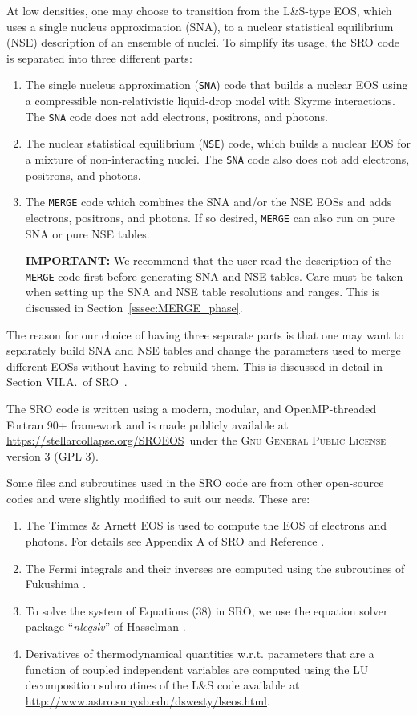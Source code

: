 \documentclass[letterpaper,11pt]{refart}
\newcommand{\srourl}{\url{https://stellarcollapse.org/SROEOS}}
\newcommand{\LS}{L\&S }
\newcommand{\LSn}{L\&S}
\begin{document}
At low densities, one may choose to transition from the \LSn-type EOS,
which uses a single nucleus approximation (SNA), to a nuclear
statistical equilibrium (NSE) description of an ensemble of nuclei. To
simplify its usage, the SRO code is separated into three different
parts:
\begin{enumerate}[label={(\arabic*)}]
 \item The single nucleus approximation (\texttt{SNA}) code that builds a
   nuclear EOS using a compressible non-relativistic liquid-drop model
   with Skyrme interactions. The \texttt{SNA} code does not add electrons,
   positrons, and photons.
 \item The nuclear statistical equilibrium (\texttt{NSE}) code, which
   builds a nuclear EOS for a mixture of non-interacting nuclei.  The
   \texttt{SNA} code also does not add electrons, positrons, and photons.

 \item The \texttt{MERGE} code which combines the SNA and/or the NSE
   EOSs and adds electrons, positrons, and photons. If so desired,
   \texttt{MERGE} can also run on pure SNA or pure NSE tables.

   \textbf{IMPORTANT:} We recommend that the user read the description
   of the \texttt{MERGE} code first before generating SNA and NSE
   tables.  Care must be taken when setting up the SNA and NSE table
   resolutions and ranges. This is discussed in
   Section~\ref{sssec:MERGE_phase}.
   
\end{enumerate}
The reason for our choice of having three separate parts is that one
may want to separately build SNA and NSE tables and change the
parameters used to merge different EOSs without having to rebuild
them.  This is discussed in detail in Section VII.A.\ of
SRO~\cite{schneider:17}.


The SRO code is written using a modern, modular, and OpenMP-threaded Fortran
90+ framework and is made publicly available at \srourl\, under the
\textsc{Gnu General Public License} version 3 (GPL 3).

Some files and subroutines used in the SRO code are from other
open-source codes and were slightly modified to suit our needs. These
are:
\begin{enumerate}
 \item The Timmes \& Arnett EOS is used to compute the EOS of electrons and photons. For details see Appendix A of SRO and Reference \cite{timmes:99}. 
 \item The Fermi integrals and their inverses are computed using the subroutines of Fukushima \cite{fukushima:15,fukushima:15b}.
 \item To solve the system of Equations (38) in SRO, we use the equation solver package ``\textit{nleqslv}'' of Hasselman \cite{hasselman:16}. 
 \item Derivatives of thermodynamical quantities w.r.t. parameters that are a function of coupled independent variables are computed using the LU decomposition subroutines of the \LS code available at \url{http://www.astro.sunysb.edu/dswesty/lseos.html}. 
\end{enumerate}
\end{document}
